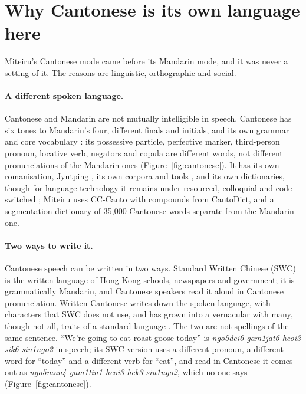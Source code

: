 ﻿\documentclass[11pt,a4paper]{article}
\begin{document}
\section{Why Cantonese is its own language here}
\label{sec:cantonese}

Miteiru's Cantonese mode came before its Mandarin mode, and it was never a setting of it. The reasons are linguistic, orthographic and social.

\paragraph{A different spoken language.}
Cantonese and Mandarin are not mutually intelligible in speech. Cantonese has six tones to Mandarin's four, different finals and initials, and its own grammar and core vocabulary \citep{matthews2011cantonese}: its possessive particle, perfective marker, third-person pronoun, locative verb, negators and copula are different words, not different pronunciations of the Mandarin ones (Figure~\ref{fig:cantonese}). It has its own romanisation, Jyutping \citep{lshkjyutping}, its own corpora and tools \citep{luke2015hkcancor,lee2022pycantonese}, and its own dictionaries, though for language technology it remains under-resourced, colloquial and code-switched \citep{xiang2025cantonese}; Miteiru uses CC-Canto \citep{cccanto} with compounds from CantoDict, and a segmentation dictionary of 35,000 Cantonese words separate from the Mandarin one.

\paragraph{Two ways to write it.}
Cantonese speech can be written in two ways. Standard Written Chinese (SWC) is the written language of Hong Kong schools, newspapers and government; it is grammatically Mandarin, and Cantonese speakers read it aloud in Cantonese pronunciation. Written Cantonese writes down the spoken language, with characters that SWC does not use, and has grown into a vernacular with many, though not all, traits of a standard language \citep{snow2004cantonese,snow2008cantonese}. The two are not spellings of the same sentence. ``We're going to eat roast goose today'' is \emph{ngo5dei6 gam1jat6 heoi3 sik6 siu1ngo2} in speech; its SWC version uses a different pronoun, a different word for ``today'' and a different verb for ``eat'', and read in Cantonese it comes out as \emph{ngo5mun4 gam1tin1 heoi3 hek3 siu1ngo2}, which no one says (Figure~\ref{fig:cantonese}).
\end{document}
